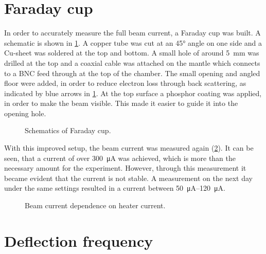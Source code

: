 \section{Faraday cup}
\label{sec:Faraday cup}

In order to accurately measure the full beam current, a Faraday cup was built. A schematic is shown in \cref{fig:Schematics of Faraday cup}. A copper tube was cut at an \ang{45} angle on one side and a Cu-sheet was soldered at the top and bottom. A small hole of around \SI{5}{\milli\meter} was drilled at the top and a coaxial cable was attached on the mantle which connects to a BNC feed through at the top of the chamber. The small opening and angled floor were added, in order to reduce electron loss through back scattering, as indicated by blue arrows in \cref{fig:Schematics of Faraday cup}. At the top surface a phosphor coating was applied, in order to make the beam visible. This made it easier to guide it into the opening hole.

\begin{figure}[h]
	\centering
	\begin{tikzpicture}
		
	\end{tikzpicture}
	
	\caption{Schematics of Faraday cup.}
	\label{fig:Schematics of Faraday cup}
\end{figure}

With this improved setup, the beam current was measured again (\cref{fig:Beam current dependence on heater current}). It can be seen, that a current of over \SI{300}{\micro\ampere} was achieved, which is more than the necessary amount for the experiment. However, through this measurement it became evident that the current is not stable. A measurement on the next day under the same settings resulted in a current between \SIrange{50}{120}{\micro\ampere}.

\begin{figure}[h]
	\centering
	\begin{tikzpicture}
		
	\end{tikzpicture}

	\caption{Beam current dependence on heater current.}
	\label{fig:Beam current dependence on heater current}
\end{figure}

\section{Deflection frequency}
\label{sec:Deflection frequency}

